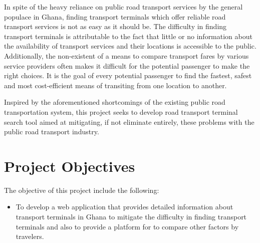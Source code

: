 In spite of the heavy reliance on public road transport services by the general populace in Ghana, finding transport terminals which offer reliable road transport services is not as easy as it should be. The difficulty in finding transport terminals is attributable to the fact that little or no information about the availability of transport services and their locations is accessible to the public. Additionally, the non-existent of a means to compare transport fares by various service providers often makes it difficult for the potential passenger to make the right choices. It is the goal of every potential passenger to find the fastest, safest and most cost-efficient means of transiting from one location to another. 

Inspired by the aforementioned shortcomings of the existing public road transportation system, this project seeks to develop road transport terminal search tool
aimed at mitigating, if not eliminate entirely, these problems with the public road transport industry.

\newpage
\section{Project Objectives}
The objective of this project include the following:
\begin{itemize}
	\item To develop a web application that provides detailed information about transport terminals in Ghana to mitigate the difficulty in finding transport terminals and also to provide a platform for to compare other factors by travelers.
\end{itemize}

